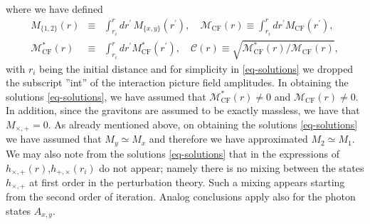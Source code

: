 \documentclass[a4paper,11pt]{article}
\begin{document}
where we have defined 
\begin{eqnarray*}
M_{\{1, 2\}}(r) &\equiv& \int_{r_i}^r dr^\prime\, M_{\{x, y\}}(r^\prime),\quad
\mathcal M_\text{CF}(r)  \equiv   \int_{r_i}^r dr^\prime M_\text{CF}(r^\prime), \\ \mathcal M_\text{CF}^*(r) & \equiv &   \int_{r_i}^r dr^\prime M_\text{CF}^*(r^\prime), \quad \mathcal C(r) \equiv \sqrt{\mathcal M_\text{CF}^*(r)/\mathcal M_\text{CF}(r)},
\end{eqnarray*}
with $r_i$ being the initial distance and for simplicity in \eqref{eq-solutions} we dropped the subscript ''int'' of the interaction picture field amplitudes. In obtaining the solutions \eqref{eq-solutions}, we have assumed that $\mathcal M_\text{CF}^*(r)\neq 0$ and $\mathcal M_\text{CF}(r)\neq 0$. In addition, since the gravitons are assumed to be exactly massless, we have that $M_{\times, +}=0$. As already mentioned above, on obtaining the solutions \eqref{eq-solutions} we have assumed that $M_y\simeq M_x$ and therefore we have approximated $M_2\simeq M_1$. We may also note from the solutions \eqref{eq-solutions} that in the expressions of $h_{\times, +}(r)$,$h_{+, \times}(r_i)$ do not appear; namely there is no mixing between the states $h_{\times, +}$ at first order in the perturbation theory. Such a mixing appears starting from the second order of iteration. Analog conclusions apply also for the photon states $A_{x, y}$.
\end{document}

